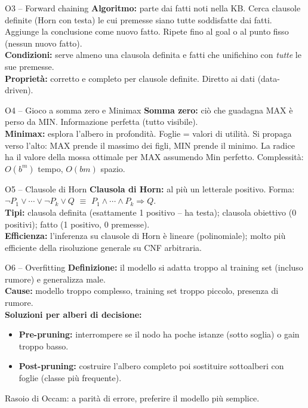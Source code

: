 \documentclass[12pt,a4paper]{article}
\begin{document}
\begin{risposta}{O3 -- Forward chaining}
\textbf{Algoritmo:} parte dai fatti noti nella KB. Cerca clausole definite (Horn con testa) le cui premesse siano tutte soddisfatte dai fatti. Aggiunge la conclusione come nuovo fatto. Ripete fino al goal o al punto fisso (nessun nuovo fatto). \\
\textbf{Condizioni:} serve almeno una clausola definita e fatti che unifichino con \emph{tutte} le sue premesse. \\
\textbf{Proprietà:} corretto e completo per clausole definite. Diretto ai dati (data-driven).
\end{risposta}

\begin{risposta}{O4 -- Gioco a somma zero e Minimax}
\textbf{Somma zero:} ciò che guadagna MAX è perso da MIN. Informazione perfetta (tutto visibile). \\
\textbf{Minimax:} esplora l'albero in profondità. Foglie = valori di utilità. Si propaga verso l'alto: MAX prende il massimo dei figli, MIN prende il minimo. La radice ha il valore della mossa ottimale per MAX assumendo Min perfetto. Complessità: $O(b^m)$ tempo, $O(bm)$ spazio.
\end{risposta}

\begin{risposta}{O5 -- Clausole di Horn}
\textbf{Clausola di Horn:} al più un letterale positivo. Forma: $\neg P_1 \lor \cdots \lor \neg P_k \lor Q$ $\equiv$ $P_1 \land \cdots \land P_k \Rightarrow Q$. \\
\textbf{Tipi:} clausola definita (esattamente 1 positivo -- ha testa); clausola obiettivo (0 positivi); fatto (1 positivo, 0 premesse). \\
\textbf{Efficienza:} l'inferenza su clausole di Horn è lineare (polinomiale); molto più efficiente della risoluzione generale su CNF arbitraria.
\end{risposta}

\begin{risposta}{O6 -- Overfitting}
\textbf{Definizione:} il modello si adatta troppo al training set (incluso rumore) e generalizza male. \\
\textbf{Cause:} modello troppo complesso, training set troppo piccolo, presenza di rumore. \\
\textbf{Soluzioni per alberi di decisione:}
\begin{itemize}[noitemsep]
  \item \textbf{Pre-pruning:} interrompere se il nodo ha poche istanze (sotto soglia) o gain troppo basso.
  \item \textbf{Post-pruning:} costruire l'albero completo poi sostituire sottoalberi con foglie (classe più frequente).
\end{itemize}
Rasoio di Occam: a parità di errore, preferire il modello più semplice.
\end{risposta}
\end{document}
